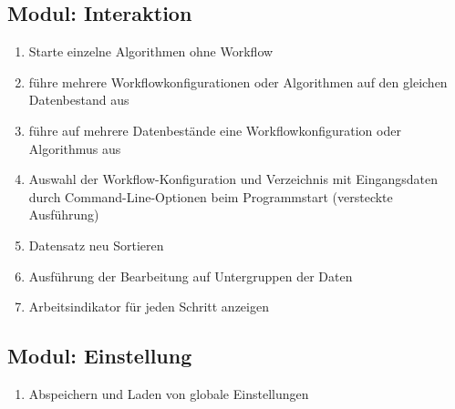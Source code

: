 	\subsection{Modul: Interaktion}
		\begin{enumerate}[ align=left, label={\textbf{\textbackslash FK4\arabic*0\textbackslash}} ]
			\item Starte einzelne Algorithmen ohne Workflow
			\item führe mehrere Workflowkonfigurationen oder Algorithmen  auf den gleichen Datenbestand aus
			\item führe auf mehrere Datenbestände eine Workflowkonfiguration oder Algorithmus aus
			\item Auswahl der Workflow-Konfiguration und Verzeichnis mit Eingangsdaten durch Command-Line-Optionen beim Programmstart (versteckte Ausführung)
			\item Datensatz neu Sortieren
			\item Ausführung der Bearbeitung auf Untergruppen der Daten
			\item Arbeitsindikator für jeden Schritt anzeigen
		\end{enumerate}

	\subsection{Modul: Einstellung}
		\begin{enumerate}[ align=left, label={\textbf{\textbackslash FK5\arabic*0\textbackslash}} ]
		\item Abspeichern und Laden von globale Einstellungen
		\end{enumerate}




